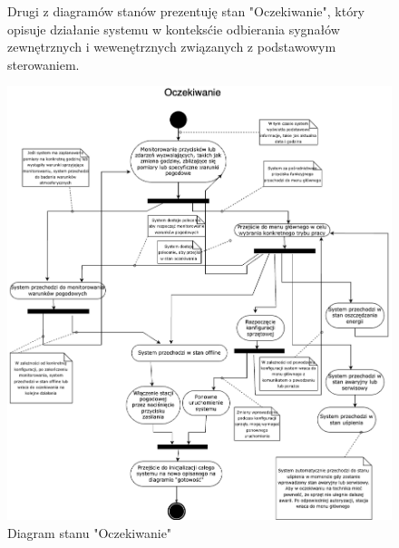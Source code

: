 \documentclass{article}
\begin{document}
\begin{figure}
    \centering
    \begin{minipage}{0.6\textwidth}
        \centering
        \large Drugi z diagramów stanów prezentuję stan "Oczekiwanie", który opisuje działanie systemu w konteksćie odbierania sygnałów zewnętrznych i wewenętrznych związanych z podstawowym sterowaniem.
    \end{minipage}
    \includegraphics[scale=0.5]{oczekiwanie.png}
    \caption{Diagram stanu "Oczekiwanie"}
    \label{etykieta2}
\end{figure}
\end{document}

